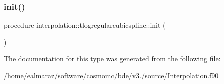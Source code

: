 \mbox{\label{structinterpolation_1_1tlogregularcubicspline_a7032c8ee075d13665a2ef0fc9f6207da}} 
\subsubsection{\texorpdfstring{init()}{init()}}
{\footnotesize\ttfamily procedure interpolation\+::tlogregularcubicspline\+::init (\begin{DoxyParamCaption}{ }\end{DoxyParamCaption})}



The documentation for this type was generated from the following file\+:\begin{DoxyCompactItemize}
\item 
/home/ealmaraz/software/cosmomc/bde/v3./source/\mbox{\hyperlink{Interpolation_8f90}{Interpolation.\+f90}}\end{DoxyCompactItemize}
